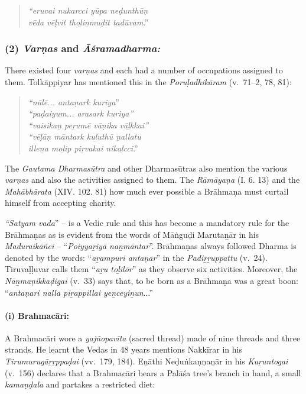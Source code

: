 \begin{quote}
\textit{“eruvai nukarcci yūpa neḍunthūṇ}\\\textit{vēda vēḷvit thoḻiṉmuḍit tadūvam}.”
\end{quote}


\subsubsection*{(2) \textit{Varṇas} and \textit{Āśramadharma:}}

\vskip -7pt

There existed four \textit{varṇas} and each had a number of occupations assigned to them. Tolkāppiyar has mentioned this in the \textit{Poruḷadhikāram} (v.~71–2, 78, 81):

\begin{quote}
\textit{“nūlē... antaṇark kuriya}”\\\textit{“paḍaiyum... arasark kuriya”}\\\textit{“vaisikaṉ peṟumē vāṇika vāḻkkai”}\\\textit{“vēḷāṇ māntark kuḻuthū ṇallatu}\\\textit{illeṉa moḻip piṟvakai nikaḻcci}.”
\end{quote}

The \textit{Gautama Dharmasūtra} and other Dharmasūtras also mention the various \textit{varṇas} and also the activities assigned to them. The \textit{Rāmāyaṇa} (I. 6. 13) and the \textit{Mahābhārata} (XIV. 102. 81) how much ever possible a Brāhmaṇa must curtail himself from accepting charity.

\textit{“Satyam vada}” – is a Vedic rule and this has become a mandatory rule for the Brāhmaṇas as is evident from the words of Māṅguḍi Marutaṉār in his \textit{Maduraikāñci} – “\textit{Poiyyaṟiyā naṉmāntar}”. Brāhmaṇas always followed Dharma is denoted by the words: “\textit{aṟampuri antaṇar}” in the \textit{Padiṟṟuppattu} (v.~24). Tiruvaḷḷuvar calls them “\textit{aṟu toḻilōr}” as they observe six activities. Moreover, the \textit{Nāṉmaṇikkaḍigai} (v.~33) says that, to be born as a Brāhmaṇa was a great boon: “\textit{antaṇari nalla piṟappillai yeṉceyiṉun}...”

\paragraph*{(i) Brahmacāri:}

\vskip -7pt

A Brahmacāri wore a \textit{yajñopavīta} (sacred thread) made of nine threads and three strands. He learnt the Vedas in 48 years mentions Nakkīrar in his \textit{Tirumurugāṟṟppaḍai} (vv.~179, 184). Eṉāthi Neḍuṅkaṇṇaṉār in his \textit{Kuṟuntogai} (v.~156) declares that a Brahmacāri bears a Palāśa tree's branch in hand, a small \textit{kamaṇḍala} and partakes a restricted diet:

